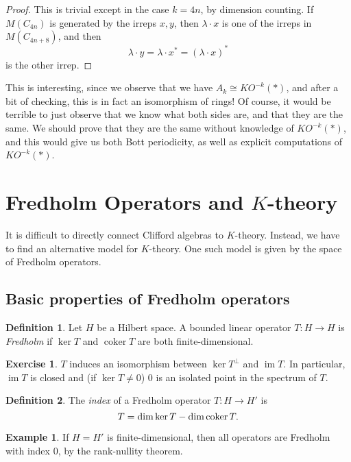 \documentclass{shortart}
\theoremstyle{definition}
\newtheorem*{defi}{Definition}
\newtheorem*{eg}{Example}
\newtheorem*{ex}{Exercise}
\let\index\relax %
\DeclareMathOperator{\coker}{coker}
\DeclareMathOperator{\index}{idx}
\DeclareMathOperator{\im}{im}
\begin{document}
\begin{proof}
  This is trivial except in the case $k = 4n$, by dimension counting. If $M(C_{4n})$ is generated by the irreps $x, y$, then $\lambda \cdot x$ is one of the irreps in $M(C_{4n + 8})$, and then
  \[
    \lambda \cdot y = \lambda \cdot x^* = (\lambda \cdot x)^*
  \]
  is the other irrep.
\end{proof}
This is interesting, since we observe that we have $A_k \cong KO^{-k}(*)$, and after a bit of checking, this is in fact an isomorphism of rings! Of course, it would be terrible to just observe that we know what both sides are, and that they are the same. We should prove that they are the same without knowledge of $KO^{-k}(*)$, and this would give us both Bott periodicity, as well as explicit computations of $KO^{-k}(*)$.

\section{Fredholm Operators and \texorpdfstring{$K$}{K}-theory}
It is difficult to directly connect Clifford algebras to $K$-theory. Instead, we have to find an alternative model for $K$-theory. One such model is given by the space of Fredholm operators.

\subsection{Basic properties of Fredholm operators}
\begin{defi}
  Let $H$ be a Hilbert space. A bounded linear operator $T: H \to H$ is \emph{Fredholm} if $\ker T$ and $\coker T$ are both finite-dimensional.
\end{defi}
\begin{ex}
  $T$ induces an isomorphism between $\ker T^\perp$ and $\im T$. In particular, $\im T$ is closed and (if $\ker T \not= 0$) $0$ is an isolated point in the spectrum of $T$.
\end{ex}

\begin{defi}
  The \emph{index} of a Fredholm operator $T: H \to H'$ is
  \[
    \index T = \dim \ker T - \dim \coker T.
  \]
\end{defi}

\begin{eg}
  If $H = H'$ is finite-dimensional, then all operators are Fredholm with index $0$, by the rank-nullity theorem.
\end{eg}
\end{document}
